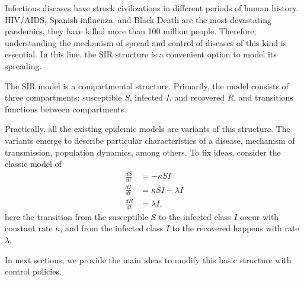   Infectious diseases have struck civilizations in different periods of human history.  HIV/AIDS, Spanish influenza, and
Black Death are the most devastating pandemics, they have
killed more than 100 million people. Therefore, understanding the mechanism of
spread and control of diseases of this kind is essential.
In this line, the SIR structure is a convenient option to model its 
spreading. 

  The SIR model is a compartmental structure. Primarily, the model consists of 
three compartments: susceptible $S$, infected $I$, and recovered $R$, %
 and transitions functions between compartments.

  Practically, all the existing epidemic models are variants of this structure. 
The variants emerge to describe particular characteristics of a disease, 
mechanism of transmission, population dynamics, among others. 
To fix ideas, consider the classic model of 
\citet{Kermac}
\begin{equation}
  \label{eqn:sir_model}
  \begin{aligned}
    \frac{dS}{dt} & = - \kappa SI
      \\
    \frac{dI}{dt} & = \kappa SI - \lambda I
      \\
    \frac{dR}{dt} & = \lambda I,
  \end{aligned}
\end{equation}
here the transition from the susceptible $S$ to the infected class $I$ 
occur with constant rate $\kappa$, and from  the infected class $I$ to the 
recovered happens with rate $\lambda$.

In next sections, we provide the main ideas to modify this 
basic structure with control policies.